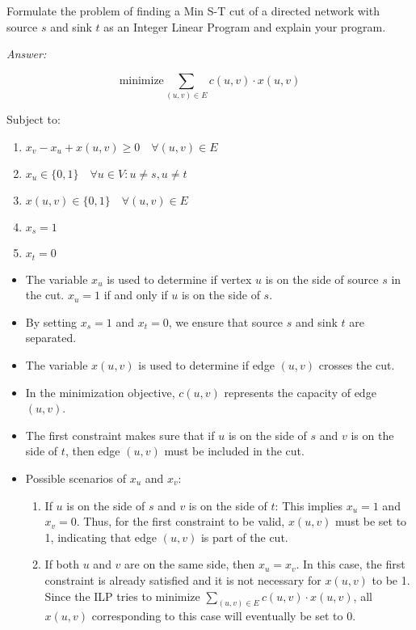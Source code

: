\documentclass[12pt]{article}
\newenvironment{problem}[2][Problem]{\begin{trivlist}
\item[\hskip \labelsep {\bfseries #1}\hskip \labelsep {\bfseries #2.}]}{\end{trivlist}}
\begin{document}
\begin{problem}{2}
    Formulate the problem of finding a Min S-T cut of a directed network with source $s$ and sink $t$ as an Integer Linear Program and explain your program.
\end{problem}

\textit{Answer:}

$$
\text{minimize} \sum_{(u,v) \in E} c(u,v) \cdot x(u,v)
$$

Subject to:
\begin{enumerate}[1.]
    \item $x_v - x_u + x(u,v) \ge 0 \quad \forall (u, v) \in E$
    \item $x_u \in \{0, 1\} \quad \forall u \in V : u \neq s, u \neq t$
    \item $x(u,v) \in \{0, 1\} \quad \forall(u, v) \in E$
    \item $x_s = 1$
    \item $x_t = 0$
\end{enumerate}
\begin{itemize}
    \item The variable $x_u$ is used to determine if vertex $u$ is on the side of source $s$ in the cut. $x_u = 1$ if and only if $u$ is on the side of $s$.
    \item By setting $x_s = 1$ and $x_t = 0$, we ensure that source $s$ and sink $t$ are separated.
    \item The variable $x(u,v)$ is used to determine if edge $(u, v)$ crosses the cut.
    \item In the minimization objective, $c(u, v)$ represents the capacity of edge $(u,v)$.
    \item The first constraint makes sure that if $u$ is on the side of $s$ and $v$ is on the side of $t$, then edge $(u, v)$ must be included in the cut.
    \item Possible scenarios of $x_u$ and $x_v$:
    \begin{enumerate}
        \item If $u$ is on the side of $s$ and $v$ is on the side of $t$: This implies $x_u = 1$ and $x_v = 0$. Thus, for the first constraint to be valid, $x(u,v)$ must be set to 1, indicating that edge $(u,v)$ is part of the cut.
        \item If both $u$ and $v$ are on the same side, then $x_u = x_v$. In this case, the first constraint is already satisfied and it is not necessary for $x(u,v)$ to be 1. Since the ILP tries to minimize $\sum_{(u,v) \in E} c(u,v) \cdot x(u,v)$, all $x(u,v)$ corresponding to this case will eventually be set to 0.
    \end{enumerate}
\end{itemize}
\end{document}
